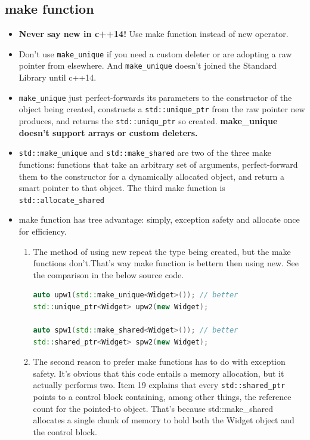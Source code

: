 \documentclass[a4paper,11pt,twoside]{book}
\begin{document}
\subsection{make function}
\begin{itemize}
	\item \textbf{Never say new in c++14!} Use make function instead of new operator.
	
	\item Don't use \texttt{make\_unique} if you need a custom deleter or are adopting a raw pointer from elsewhere. And \texttt{make\_unique} doesn't joined the Standard Library until c++14.
	
	\item \texttt{make\_unique} just perfect-forwards its parameters to the constructor of the object being created, constructs a \texttt{std::unique\_ptr} from the raw pointer new produces, and returns the \texttt{std::uniqu\_ptr} so created. \textbf{make\_unique doesn't support arrays or custom deleters.}
	
	\item \texttt{std::make\_unique} and \texttt{std::make\_shared} are two of the three make functions: functions that take an arbitrary set of arguments, perfect-forward them to the constructor for a dynamically allocated object, and return a smart pointer to that object. The third make function is \texttt{std::allocate\_shared}
	
	\item make function has tree advantage: simply, exception safety and allocate once for efficiency.
	
	\begin{enumerate}
		\item The method of using new repeat the type being created, but the make functions don't.That's way make function is bettern then using new. See the comparison in the below source code. 
\begin{lstlisting}[frame=single, language=c++, mathescape=true]
auto upw1(std::make_unique<Widget>()); // better
std::unique_ptr<Widget> upw2(new Widget); 
		
auto spw1(std::make_shared<Widget>()); // better
std::shared_ptr<Widget> spw2(new Widget); 
\end{lstlisting}
		
		\item The second reason to prefer make functions has to do with exception safety. It's obvious that this code entails a memory allocation, but it actually performs two. Item 19 explains that every \texttt{std::shared\_ptr} points to a control block containing, among other things, the reference count for the pointed-to object. That's because std::make\_shared allocates a single chunk of memory to hold both the Widget object and the control block.
		

\end{enumerate}
\end{itemize}
\end{document}
